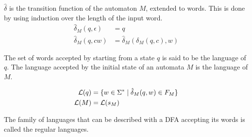 \begin{definition}
    $\hat\delta$ is the transition function of the automaton $M$, extended to words.
    This is done by using induction over the length of the input word.
    \begin{align}
        \hat\delta_M(q, \epsilon) &= q\\
        \hat\delta_M(q, c w) &= \hat\delta_M(\delta_M(q, c), w)
    \end{align}
\end{definition}

\begin{definition}
    The set of words accepted by starting from a state $q$ is said to be the language of $q$.
    The language accepted by the initial state of an automata $M$ is the language of $M$.

    \begin{align}
        \mathcal{L}(q) &= \{ w \in \Sigma^\ast \mid \hat\delta_M(q, w) \in F_M \}\\
        \mathcal{L}(M) &= \mathcal{L}(s_M)
    \end{align}
\end{definition}

\begin{definition}
    The family of languages that can be described with a DFA
    accepting its words is called the regular languages.
\end{definition}

